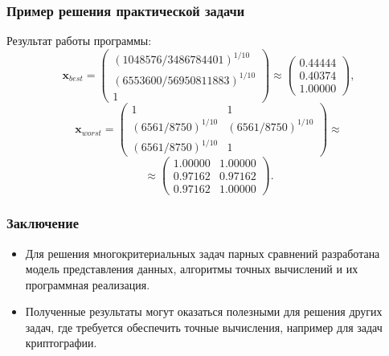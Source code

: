 \documentclass[ucs, notheorems, handout]{beamer}
\begin{document}
\begin{frame}
    \frametitle{Пример решения практической задачи}

Результат работы программы:
$$\bm{x}_{best} =
\begin{pmatrix}
(1048576/3486784401)^{1/10}\\
(6553600/56950811883)^{1/10}\\
1
\end{pmatrix} \approx
\begin{pmatrix}
0.44444\\
0.40374\\
1.00000
\end{pmatrix},
$$
$$\bm{x}_{worst} =
\begin{pmatrix}
1 & 1\\
(6561/8750)^{1/10} & (6561/8750)^{1/10}\\
(6561/8750)^{1/10} & 1
\end{pmatrix} \approx$$
$$\approx
\begin{pmatrix}
1.00000 & 1.00000\\
0.97162 & 0.97162\\
0.97162 & 1.00000
\end{pmatrix}.
$$
    
\end{frame}

\begin{frame}
    \frametitle{Заключение}
    \begin{itemize}
        
        
        
        \item Для решения многокритериальных задач парных сравнений разработана модель представления данных, алгоритмы точных вычислений и их программная реализация. 
			
        \item Полученные результаты могут оказаться полезными для решения других задач, где требуется обеспечить точные вычисления, например для задач криптографии. 
    \end{itemize}
\end{frame}
\end{document}
